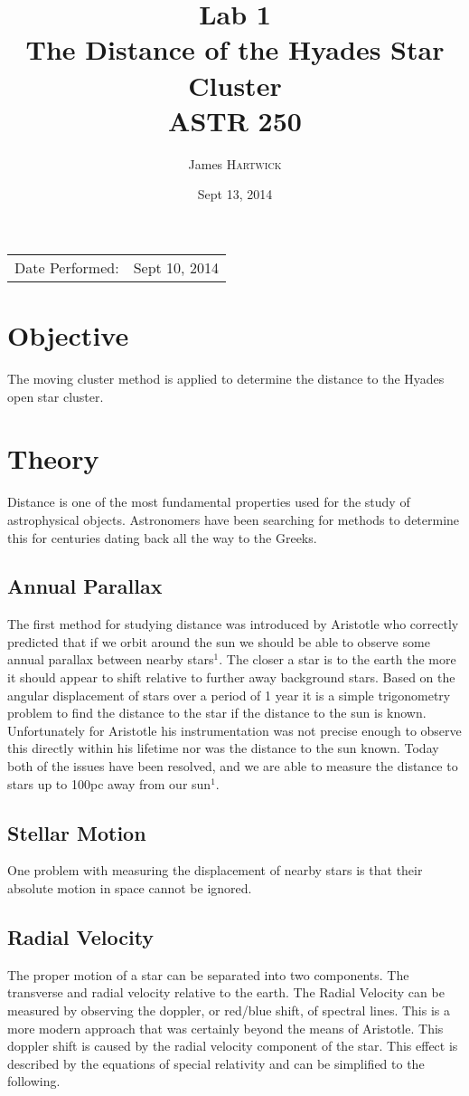 \documentclass{article}
\title{Lab 1 \\ The Distance of the Hyades Star Cluster \\ ASTR 250} %
\author{James \textsc{Hartwick}} %
\date{Sept 13, 2014} %
\begin{document}
\maketitle %

\begin{center}
\begin{tabular}{l r}
Date Performed: & Sept 10, 2014 \\ %
\end{tabular}
\end{center}

\section{Objective}
The moving cluster method is applied to determine the distance to the Hyades open star cluster.
\section{Theory}
Distance is one of the most fundamental properties used for the study of astrophysical objects. Astronomers have been searching for methods to determine this for centuries dating back all the way to the Greeks.
\subsection{Annual Parallax}
The first method for studying distance was introduced by Aristotle who correctly predicted that if we orbit around the sun we should be able to observe some annual parallax between nearby stars$^1$. The closer a star is to the earth the more it should appear to shift relative to further away background stars. Based on the angular displacement of stars over a period of 1 year it is a simple trigonometry problem to find the distance to the star if the distance to the sun is known. Unfortunately for Aristotle his instrumentation was not precise enough to observe this directly within his lifetime nor was the distance to the sun known. Today both of the issues have been resolved, and we are able to measure the distance to stars up to 100pc away from our sun$^1$.
\subsection{Stellar Motion}
One problem with measuring the displacement of nearby stars is that their absolute motion in space cannot be ignored. 
\subsection{Radial Velocity}
The proper motion of a star can be separated into two components. The transverse and radial velocity relative to the earth. The Radial Velocity can be measured by observing the doppler, or red/blue shift, of spectral lines. This is a more modern approach that was certainly beyond the means of Aristotle. This doppler shift is caused by the radial velocity component of the star. This effect is described by the equations of special relativity and can be simplified to the following.\\
\end{document}
